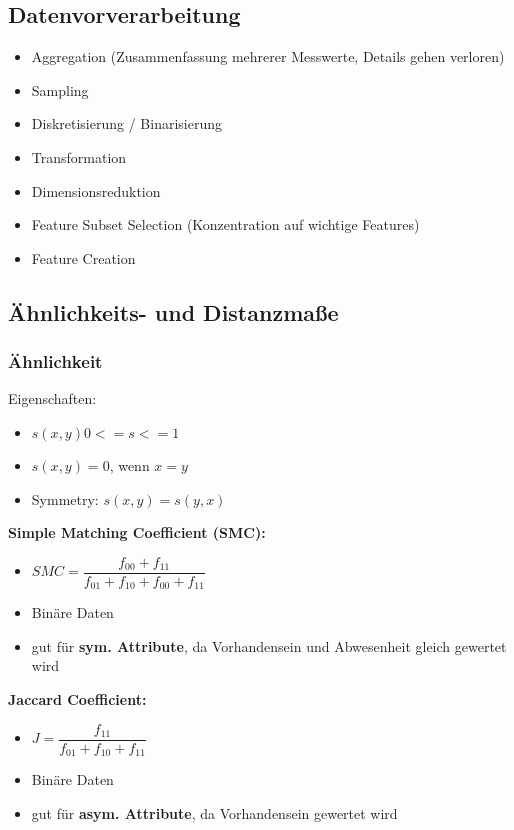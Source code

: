 \documentclass[a4paper]{article}
\begin{document}
\begin{landscape}
\begin{multicols}{3}
    \subsection{Datenvorverarbeitung}

    \begin{itemize}[noitemsep,nolistsep]
        \item Aggregation (Zusammenfassung mehrerer Messwerte, Details gehen verloren)
        \item Sampling
        \item Diskretisierung / Binarisierung
        \item Transformation
        \item Dimensionsreduktion
        \item Feature Subset Selection (Konzentration auf wichtige Features)
        \item Feature Creation
    \end{itemize}

    \subsection{Ähnlichkeits- und Distanzmaße}
            \subsubsection{Ähnlichkeit}

            Eigenschaften:
            \begin{itemize}[noitemsep,nolistsep]
                \item $s(x,y) 0 <= s <= 1$
                \item $s(x,y) = 0$, wenn $x = y$
                \item Symmetry: $s(x,y) = s(y,x)$
            \end{itemize}

            \textbf{Simple Matching Coefficient (SMC):}
            \begin{itemize}[noitemsep,nolistsep]
                \item $ SMC = \dfrac{f_{00}+f_{11}}{f_{01}+ f_{10}+ f_{00}+ f_{11}} $
                \item Binäre Daten
                \item gut für \textbf{sym. Attribute}, da Vorhandensein und Abwesenheit gleich gewertet wird
            \end{itemize}

            \textbf{Jaccard Coefficient:}
            \begin{itemize}[noitemsep,nolistsep]
                \item $ J = \dfrac{f_{11}}{f_{01}+ f_{10}+ f_{11}} $
                \item Binäre Daten
                \item gut für \textbf{asym. Attribute}, da Vorhandensein gewertet wird
            \end{itemize}


\end{multicols}
\end{landscape}
\end{document}
